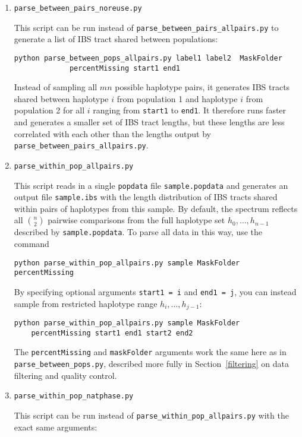 \documentclass[12pt]{article}
\begin{document}
\begin{enumerate}
\item \verb|parse_between_pairs_noreuse.py|

This script can be run instead of \verb|parse_between_pairs_allpairs.py| to generate a list of IBS tract shared between populations:


\begin{Verbatim}
python parse_between_pops_allpairs.py label1 label2  MaskFolder 
			 percentMissing start1 end1
\end{Verbatim}
 Instead of sampling all  $mn$ possible haplotype pairs, it generates IBS tracts shared between haplotype $i$ from population 1 and haplotype $i$ from population 2 for all $i$ ranging from \texttt{start1} to \texttt{end1}. It therefore runs faster and generates a smaller set of IBS tract lengths, but these lengths are less correlated with each other than the lengths output by \verb|parse_between_pairs_allpairs.py|.

\item \verb|parse_within_pop_allpairs.py|

This script reads in a single \texttt{popdata} file \texttt{sample.popdata} and generates an output file \texttt{sample.ibs} with the length distribution of IBS tracts shared within pairs of haplotypes from this sample. By default, the spectrum reflects all $\binom{n}{2}$ pairwise comparisons from the full haplotype set $h_0,\ldots,h_{n-1}$ described by \texttt{sample.popdata}. To parse all data in this way, use the command

\begin{verbatim}
python parse_within_pop_allpairs.py sample MaskFolder percentMissing
\end{verbatim}

By specifying optional arguments \texttt{start1 = i} and \texttt{end1 = j}, you can instead sample from restricted haplotype range $h_i,\ldots,h_{j-1}$: 

\begin{Verbatim}
python parse_within_pop_allpairs.py sample MaskFolder 
	percentMissing start1 end1 start2 end2
\end{Verbatim}


The \texttt{percentMissing} and \texttt{maskFolder} arguments work the same here as in \verb|parse_between_pops.py|, described more fully in Section~\ref{filtering} on data filtering and quality control.

\item \verb|parse_within_pop_natphase.py|

This script can be run instead of \verb|parse_within_pop_allpairs.py| with the exact same arguments: 


\end{enumerate}
\end{document}
